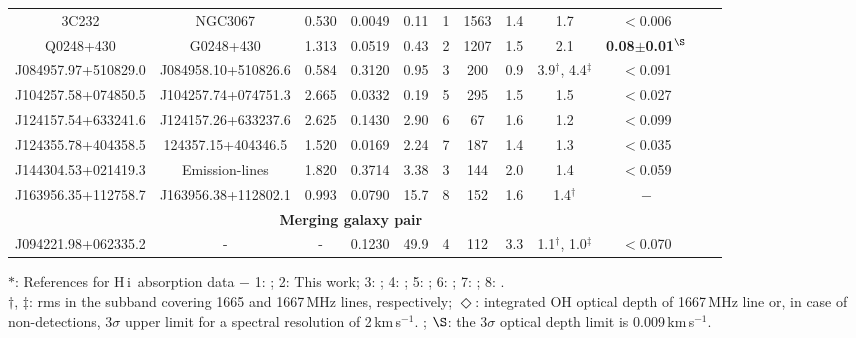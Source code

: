 \documentclass[iop,apjl,numberedappendix,appendixfloats,twocolappendix,revtex4]{emulateapj}
\newcommand{\hi}{\mbox{H\,{\sc i}}}
\newcommand{\kms}{km\,s$^{-1}$}
\begin{document}
\begin{table*}
\begin{center}
\begin{tabular}{cccccccccccc}
3C232              &   NGC3067           &0.530 & 0.0049 &   0.11              &   1   &    1563             &   1.4     &    1.7           &  $<$0.006 \\ 
Q0248+430          &   G0248+430         &1.313 & 0.0519 &   0.43              &   2   &    1207             &   1.5     &    2.1           & {\bf 0.08$\pm$0.01}$^\S$ \\ 
J084957.97+510829.0& J084958.10+510826.6 &0.584 & 0.3120 &   0.95              &   3   &    200              &   0.9     &  3.9$^\dag$, 4.4$^\ddag$   & $<$0.091 \\  
J104257.58+074850.5& J104257.74+074751.3 &2.665 & 0.0332 &   0.19              &   5   &    295              &   1.5     &    1.5           &  $<$0.027 \\
J124157.54+633241.6& J124157.26+633237.6 &2.625 & 0.1430 &   2.90              &   6   &     67              &   1.6     &    1.2           &  $<$0.099 \\
J124355.78+404358.5& 124357.15+404346.5  &1.520 & 0.0169 &   2.24              &   7   &    187              &   1.4     &    1.3           &  $<$0.035 \\
J144304.53+021419.3&  Emission-lines     &1.820 & 0.3714 &   3.38              &   3   &    144              &   2.0     &    1.4           &  $<$0.059 \\
J163956.35+112758.7& J163956.38+112802.1 &0.993 & 0.0790 &   15.7              &   8   &    152              &   1.6     &    1.4$^\dag$    &  $-$      \\
\multicolumn{10}{c}{\bf {Merging galaxy pair}}   \\                     
J094221.98+062335.2&      -            & -    & 0.1230 &   49.9              &   4   &    112              &   3.3     &  1.1$^\dag$, 1.0$^\ddag$   & $<$0.070 \\  

\hline
\end{tabular}
\end{center}
$*$:  References for \hi\ absorption data $-$ 1: \citet[][]{Carilli92}; 2: This work; 3: \citet[][]{Gupta13}; 4: \citet[][]{Srianand15}; 
5: \citet[][]{Borthakur10}; 6: \citet[][]{Gupta10}; 7: \citet[][]{Gupta17gvlbi}; 8: \citet[][]{Srianand13dib}.\\ 
$\dag$, $\ddag$: rms in the subband covering 1665 and 1667\,MHz lines, respectively; $\Diamond$: integrated OH optical depth of 1667\,MHz line or, in case of 
non-detections, 3$\sigma$ upper limit for a spectral resolution of 2\,\kms.   ; $\S$: the 3$\sigma$ optical depth limit is 0.009\,\kms.\\

\label{ohsamp}
\end{table*}
\end{document}

